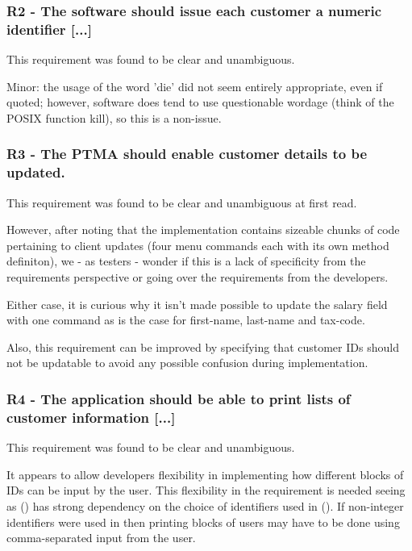 \subsubsection{R2 - The software should issue each customer a numeric identifier [...]} 

This requirement was found to be clear and unambiguous. 
\par
Minor: the usage of the word 'die' did not seem entirely appropriate, even if quoted; however, software does tend to use questionable wordage (think of the POSIX function kill), so this is a non-issue.  

\subsubsection{R3 - The PTMA should enable customer details to be updated.}

This requirement was found to be clear and unambiguous at first read. 
\par
However, after noting that the implementation contains sizeable chunks of code pertaining to client updates (four menu commands each with its own method definiton), we - as testers - wonder if this is a lack of specificity from the requirements perspective or going over the requirements from the developers. 
\par
Either case, it is curious why it isn't made possible to update the salary field with one command as is the case for first-name, last-name and tax-code.  
\par
Also, this requirement can be improved by specifying that customer IDs should not be updatable to avoid any possible confusion during implementation. 

\subsubsection{R4 - The application should be able to print lists of customer information [...]} 
This requirement was found to be clear and unambiguous. 

It appears to allow developers flexibility in implementing how different blocks of IDs can be input by the user. This flexibility in the requirement is needed seeing as (\RFour) has strong dependency on the choice of identifiers used in (\RTwo). If non-integer identifiers were used in \RTwo then printing blocks of users may have to be done using comma-separated input from the user. 

